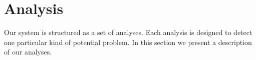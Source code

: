 \section{Analysis}
\label{sec:analysis}
Our system is structured as a set of analyses. Each analysis is designed to detect one particular kind of potential problem. In this section we present a description of our analyses.






